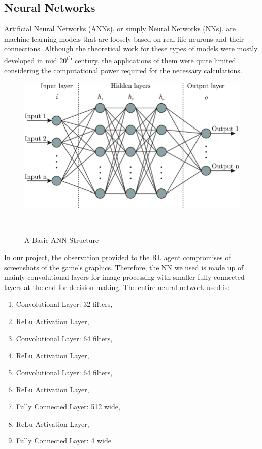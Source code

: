 \subsection{Neural Networks}
Artificial Neural Networks (ANNs), or simply Neural Networks (NNs), are
machine learning models that are loosely based on real life neurons and their connections.
Although the theoretical work for these types of models were mostly developed in mid
20\textsuperscript{th} century, the applications of them were quite limited considering
the computational power required for the necessary calculations.

\begin{figure}[h]
    \centering{}
    \includegraphics[width=\linewidth, height=0.3\textheight, keepaspectratio]{img/ann.png}
    \caption{A Basic ANN Structure~\autocite{buseyarentekin}}~\label{fig:ANN}
\end{figure}

In our project, the observation provided to the RL agent compromises of screenshots of
the game's graphics. Therefore, the NN we used is made up of mainly convolutional layers
for image processing with smaller fully connected layers at the end for decision making.
The entire neural network used is:
\begin{enumerate}
    \item Convolutional Layer: 32 filters,
    \item ReLu Activation Layer,
    \item Convolutional Layer: 64 filters,
    \item ReLu Activation Layer,
    \item Convolutional Layer: 64 filters,
    \item ReLu Activation Layer,
    \item Fully Connected Layer: 512 wide,
    \item ReLu Activation Layer,
    \item Fully Connected Layer: 4 wide
\end{enumerate}

